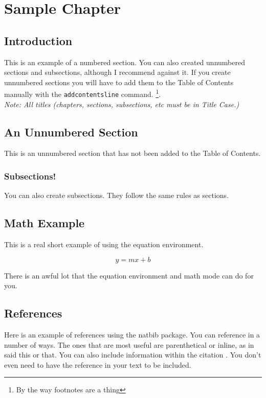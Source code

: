 \documentclass[12pt]{report} %
\begin{document}
\chapter{Sample Chapter}
\thispagestyle{fancy} %

\section{Introduction}
This is an example of a numbered section. You can also created unnumbered sections and subsections, although
I recommend against it. If you create unnumbered sections you will have to add them to the Table of Contents 
manually with the \texttt{addcontentsline} command. \footnote{By the way footnotes are a thing}.\\

\textit{Note: All titles (chapters, sections, subsections, etc must be in Title Case.)} 

\section*{An Unnumbered Section}
This is an unnumbered section that has not been added to the Table of Contents.

\subsection{Subsections!}
You can also create subsections. They follow the same rules as sections.


\section{Math Example}
This is a real short example of using the equation environment.

\begin{equation}
	y = mx + b
\end{equation}

There is an awful lot that the equation environment and math mode can do for you.


\section{References}
Here is an example of references using the natbib package. You can reference in a number of ways.  The
ones that are most useful are parenthetical \citep{article,articletwo} or inline, as in \citet{articletwo} 
said this or that. You can also include information within the citation \citep[e.g.][doesn't have any
page numbers]{2003jgr}.  You don't even need to have the reference in your text to be included. \nocite{2004LPI}
\end{document}
